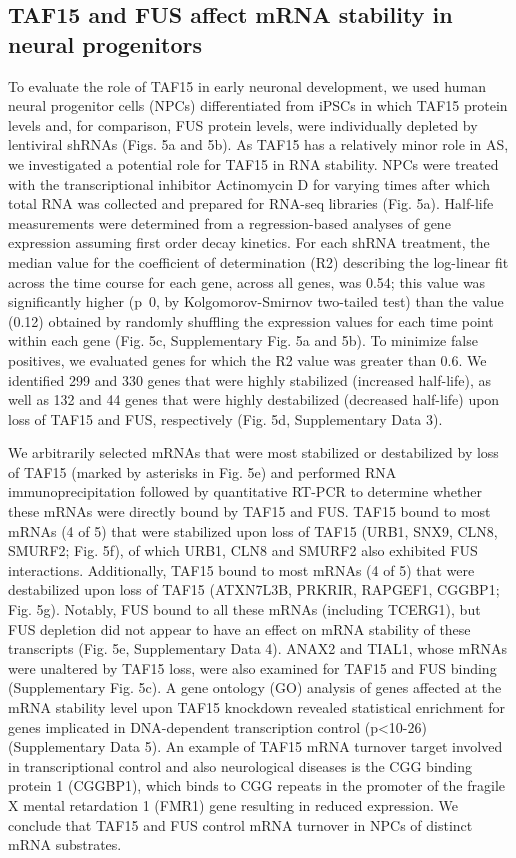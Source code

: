 \subsection{TAF15 and FUS affect mRNA stability in neural progenitors}
To evaluate the role of TAF15 in early neuronal development, we used human neural progenitor cells (NPCs) differentiated from iPSCs in which TAF15 protein levels and, for comparison, FUS protein levels, were individually depleted by lentiviral shRNAs (Figs. 5a and 5b). As TAF15 has a relatively minor role in AS, we investigated a potential role for TAF15 in RNA stability. NPCs were treated with the transcriptional inhibitor Actinomycin D for varying times after which total RNA was collected and prepared for RNA-seq libraries (Fig. 5a). Half-life measurements were determined from a regression-based analyses of gene expression assuming first order decay kinetics. For each shRNA treatment, the median value for the coefficient of determination (R2) describing the log-linear fit across the time course for each gene, across all genes, was 0.54; this value was significantly higher (p~0, by Kolgomorov-Smirnov two-tailed test) than the value (0.12) obtained by randomly shuffling the expression values for each time point within each gene (Fig. 5c, Supplementary Fig. 5a and 5b). To minimize false positives, we evaluated genes for which the R2 value was greater than 0.6. We identified 299 and 330 genes that were highly stabilized (increased half-life), as well as 132 and 44 genes that were highly destabilized (decreased half-life) upon loss of TAF15 and FUS, respectively (Fig. 5d, Supplementary Data 3).


We arbitrarily selected mRNAs that were most stabilized or destabilized by loss of TAF15 (marked by asterisks in Fig. 5e) and performed RNA immunoprecipitation followed by quantitative RT-PCR to determine whether these mRNAs were directly bound by TAF15 and FUS. TAF15 bound to most mRNAs (4 of 5) that were stabilized upon loss of TAF15 (URB1, SNX9, CLN8, SMURF2; Fig. 5f), of which URB1, CLN8 and SMURF2 also exhibited FUS interactions. Additionally, TAF15 bound to most mRNAs (4 of 5) that were destabilized upon loss of TAF15 (ATXN7L3B, PRKRIR, RAPGEF1, CGGBP1; Fig. 5g). Notably, FUS bound to all these mRNAs (including TCERG1), but FUS depletion did not appear to have an effect on mRNA stability of these transcripts (Fig. 5e, Supplementary Data 4). ANAX2 and TIAL1, whose mRNAs were unaltered by TAF15 loss, were also examined for TAF15 and FUS binding (Supplementary Fig. 5c). A gene ontology (GO) analysis of genes affected at the mRNA stability level upon TAF15 knockdown revealed statistical enrichment for genes implicated in DNA-dependent transcription control (p<10-26) (Supplementary Data 5). An example of TAF15 mRNA turnover target involved in transcriptional control and also neurological diseases is the CGG binding protein 1 (CGGBP1), which binds to CGG repeats in the promoter of the fragile X mental retardation 1 (FMR1) gene resulting in reduced expression\cite{Muller-Hartmann2000}. We conclude that TAF15 and FUS control mRNA turnover in NPCs of distinct mRNA substrates.

